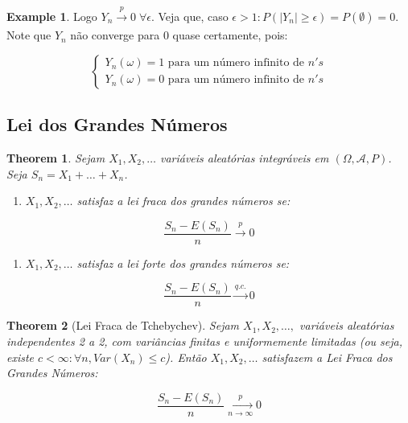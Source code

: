 \documentclass[
]{article}
\providecommand{\tightlist}{%
  \setlength{\itemsep}{0pt}\setlength{\parskip}{0pt}}
\newtheorem{theorem}{Theorem}[section]
\theoremstyle{definition}
\theoremstyle{definition}
\newtheorem{example}{Example}[section]
\theoremstyle{definition}
\theoremstyle{definition}
\theoremstyle{remark}
\begin{document}
\begin{example}
Logo \(Y_{n} \xrightarrow[]{p}0 \; \forall \epsilon\). Veja que, caso \(\epsilon > 1: P(|Y_{n}| \ge \epsilon) = P(\emptyset) = 0\). Note que \(Y_{n}\) não converge para 0 quase certamente, pois:

\begin{equation*}
\begin{cases}
Y_{n}(\omega) = 1 \text{ para um número infinito de }n's \\
Y_{n}(\omega) = 0 \text{ para um número infinito de }n's
\end{cases}
\end{equation*}
\end{example}

\hypertarget{lei-dos-grandes-nuxfameros}{%
\subsection{Lei dos Grandes Números}\label{lei-dos-grandes-nuxfameros}}

\begin{theorem}
Sejam \(X_{1},X_{2},\ldots\) variáveis aleatórias integráveis em \((\Omega, \mathcal{A}, P)\). Seja \(S_{n} = X_{1} + \ldots + X_{n}\).

\begin{enumerate}
\def\labelenumi{\arabic{enumi}.}
\tightlist
\item
  \(X_{1},X_{2},\ldots\) satisfaz a lei fraca dos grandes números se:
\end{enumerate}

\begin{equation*}
\frac{S_{n} - E(S_{n})}{n} \xrightarrow[]{p} 0
\end{equation*}

\begin{enumerate}
\def\labelenumi{\arabic{enumi}.}
\setcounter{enumi}{1}
\tightlist
\item
  \(X_{1},X_{2},\ldots\) satisfaz a lei forte dos grandes números se:
\end{enumerate}

\begin{equation*}
\frac{S_{n} - E(S_{n})}{n} \xrightarrow[]{q.c.} 0
\end{equation*}
\end{theorem}

\begin{theorem}[Lei Fraca de Tchebychev]
\protect\hypertarget{thm:leifractcheb}{}\label{thm:leifractcheb}Sejam \(X_{1},X_{2},\ldots,\) variáveis aleatórias independentes 2 a 2, com variâncias finitas e uniformemente limitadas (ou seja, existe \(c < \infty : \forall n, Var(X_{n}) \le c\)). Então \(X_{1},X_{2},\ldots\) satisfazem a Lei Fraca dos Grandes Números:

\begin{equation*}
\frac{S_{n} - E(S_{n})}{n} \xrightarrow[n \to \infty]{p} 0
\end{equation*}
\end{theorem}
\end{document}
